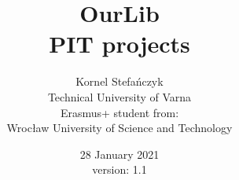 


\title{OurLib\\ \large{PIT projects}}
\author{Kornel Stefańczyk 
\\Technical University of Varna
\\ Erasmus+ student from: 
\\ Wrocław University of Science and Technology}
\date{28 January 2021 \\version: 1.1}



\maketitle
\newpage






